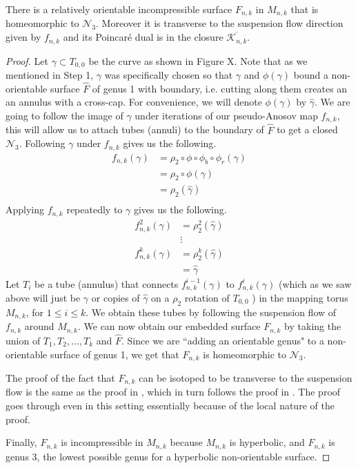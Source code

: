 \begin{lem}
\label{lem:genus3}
There is a relatively orientable incompressible surface $F_{n,k}$ in $M_{n,k}$ that is homeomorphic to $\mathcal{N}_3$.
Moreover it is transverse to the suspension flow direction given by $f_{n,k}$ and its Poincar\'e dual is in
the closure $\overline{\mathcal{K}_{n,k}}$.
\end{lem}
\begin{proof}
  Let $\gamma \subset T_{0,0}$ be the curve as shown in Figure X. Note that as we mentioned in Step 1,
  $\gamma$ was specifically chosen so that $\gamma$ and $\phi(\gamma)$ bound a non-orientable surface
  $\hat{F}$ of genus 1 with boundary, i.e. cutting along them creates an an annulus with a cross-cap. For
  convenience, we will denote $\phi(\gamma)$ by $\hat{\gamma}$. We are going to follow the image of $\gamma$
  under iterations of our pseudo-Anosov map $f_{n,k}$, this will allow us to attach tubes (annuli) to the
  boundary of $\hat{F}$ to get a closed $\mathcal{N}_3$. Following $\gamma$ under $f_{n,k}$ gives us the
  following.
  \begin{align*}
    f_{n,k}(\gamma) &= \rho_2 \circ \phi \circ \phi_b \circ \phi_r(\gamma) \\
                    &= \rho_2 \circ \phi(\gamma) \\
                    &= \rho_2(\hat{\gamma}) \\
  \end{align*}
  Applying $f_{n,k}$ repeatedly to ${\gamma}$ gives us the following.
  \begin{align*}
    f^2_{n,k}(\gamma) &= \rho_2^2(\hat{\gamma}) \\
                      &\vdots \\
    f^k_{n,k}(\gamma) &= \rho_2^k(\hat{\gamma})\\
                      &= \hat{\gamma}
  \end{align*}
  Let $T_i$ be a tube (annulus) that connects $f_{n,k}^{i-1}(\gamma)$ to $f_{n,k}^i(\gamma)$
  (which as we saw above will just be $\gamma$ or copies of $\hat{\gamma}$ on a $\rho_2$ rotation of $T_{0,0}$
  ) in the mapping torus $M_{n,k}$, for $1 \leq i \leq k$. We obtain these tubes by following the suspension
  flow of $f_{n,k}$ around $M_{n,k}$. We can now obtain our embedded surface $F_{n,k}$ by taking the union of
  $T_1,T_2,\dots,T_k$ and $\hat{F}$. Since we are ``adding an orientable genus" to a non-orientable surface of
  genus 1, we get that $F_{n,k}$ is homeomorphic to $\mathcal{N}_3$.

  The proof of the fact that $F_{n,k}$ can be isotoped to be transverse to the suspension flow is the same as the
  proof in \cite{yazdi2018pseudo}, which in turn follows the proof in \cite{leininger2013number}. The proof goes
  through even in this setting essentially because of the local nature of the proof.

  Finally, $F_{n,k}$ is incompressible in $M_{n,k}$ because $M_{n,k}$ is hyperbolic, and $F_{n,k}$ is genus $3$, the
  lowest possible genus for a hyperbolic non-orientable surface.
\end{proof}

